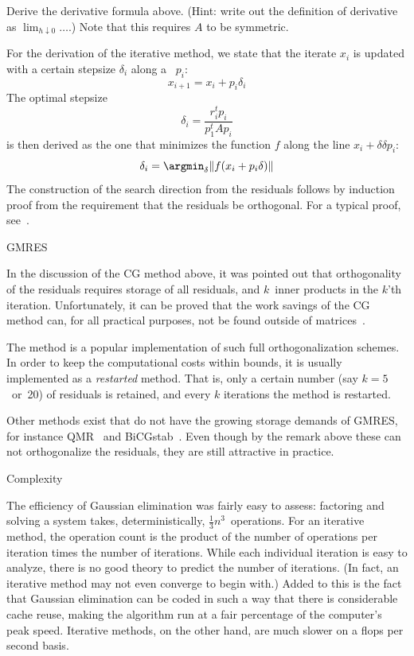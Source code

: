 \begin{exercise}
  Derive the derivative formula above. (Hint: write out the definition
  of derivative as $\lim_{h\downarrow0}\ldots$.) Note that this
  requires $A$ to be symmetric.
\end{exercise}

For the derivation of the iterative method, we state that the iterate
$x_i$ is updated with a certain stepsize $\delta_i$ along a
~$p_i$:
\[ x_{i+1} = x_i+p_i\delta_i \]
The optimal stepsize
\[ \delta_i=\frac{r_i^tp_i}{p_1^tAp_i} \]
is then derived as the one that minimizes the function $f$ along the
line $x_i+\delta\delta p_i$:
\[ \delta_i = \argmin_\delta \| f(x_i+p_i\delta) \| \]
The construction of the search direction from the residuals follows by
induction proof from the requirement that the residuals be
orthogonal. For a typical proof, see~\cite{AxBa:febook}.

 {GMRES}
\label{sec:gmres}

In the discussion of the \ac{CG} method above, it was pointed out that
orthogonality of the residuals requires storage of all residuals, and
$k$~inner products in the $k$'th iteration. Unfortunately, it can be
proved that the work savings of the \ac{CG} method can, for all
practical purposes, not be found outside of 
matrices~\cite{FaberManteuffel:conditions-for-existence}.

The  method is a popular implementation of such full
orthogonalization schemes. In order to keep the computational costs
within bounds, it is usually implemented as a \emph{restarted}
method. That is, only a certain number (say $k=5$~or~20) of residuals
is retained, and every $k$ iterations the method is restarted. 


Other methods exist that do not have the growing storage demands of
\ac{GMRES}, for instance QMR~\cite{FrNa:qmr} and
BiCGstab~\cite{vdVorst1992:bicgstab}. Even though by the remark above
these can not orthogonalize the residuals, they are still attractive
in practice.

 {Complexity}

The efficiency of Gaussian elimination was fairly easy to assess:
factoring and solving a system takes, deterministically,
$\frac13n^3$~operations. For an iterative method, the operation count
is the product of the number of operations per iteration times the
number of iterations. While each individual iteration is easy to
analyze, there is no good theory to predict the number of
iterations. (In fact, an iterative method may not even converge to
begin with.) Added to this is the fact that Gaussian elimination can
be coded in such a way that there is considerable cache reuse, making
the algorithm run at a fair percentage of the computer's peak
speed. Iterative methods, on the other hand, are much slower on a
flops per second basis.

